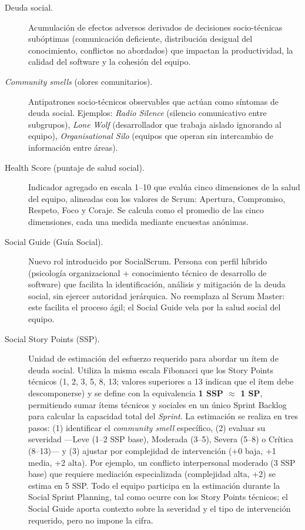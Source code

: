\begin{description}
    \item[Deuda social.]
          Acumulación de efectos adversos derivados de decisiones socio-técnicas subóptimas (comunicación deficiente, distribución desigual del conocimiento, conflictos no abordados) que impactan la productividad, la calidad del software y la cohesión del equipo.

    \item[\textit{Community smells} (olores comunitarios).]
          Antipatrones socio-técnicos observables que actúan como síntomas de deuda social. Ejemplos: \textit{Radio Silence} (silencio comunicativo entre subgrupos), \textit{Lone Wolf} (desarrollador que trabaja aislado ignorando al equipo), \textit{Organisational Silo} (equipos que operan sin intercambio de información entre áreas).

    \item[Health Score (puntaje de salud social).]
          Indicador agregado en escala 1--10 que evalúa cinco dimensiones de la salud del equipo, alineadas con los valores de Scrum: Apertura, Compromiso, Respeto, Foco y Coraje. Se calcula como el promedio de las cinco dimensiones, cada una medida mediante encuestas anónimas.

    \item[Social Guide (Guía Social).]
          Nuevo rol introducido por SocialScrum. Persona con perfil híbrido (psicología organizacional + conocimiento técnico de desarrollo de software) que facilita la identificación, análisis y mitigación de la deuda social, sin ejercer autoridad jerárquica. No reemplaza al Scrum Master: este facilita el proceso ágil; el Social Guide vela por la salud social del equipo.

    \item[Social Story Points (SSP).]
          Unidad de estimación del esfuerzo requerido para abordar un ítem de deuda social. Utiliza la misma escala Fibonacci que los Story Points técnicos (1, 2, 3, 5, 8, 13; valores superiores a 13 indican que el ítem debe descomponerse) y se define con la equivalencia \textbf{1 SSP $\approx$ 1 SP}, permitiendo sumar ítems técnicos y sociales en un único Sprint Backlog para calcular la capacidad total del \textit{Sprint}. La estimación se realiza en tres pasos: (1) identificar el \textit{community smell} específico, (2) evaluar su severidad ---Leve (1--2 SSP base), Moderada (3--5), Severa (5--8) o Crítica (8--13)--- y (3) ajustar por complejidad de intervención (+0 baja, +1 media, +2 alta). Por ejemplo, un conflicto interpersonal moderado (3 SSP base) que requiere mediación especializada (complejidad alta, +2) se estima en 5 SSP. Todo el equipo participa en la estimación durante la Social Sprint Planning, tal como ocurre con los Story Points técnicos; el Social Guide aporta contexto sobre la severidad y el tipo de intervención requerido, pero no impone la cifra.


\end{description}
